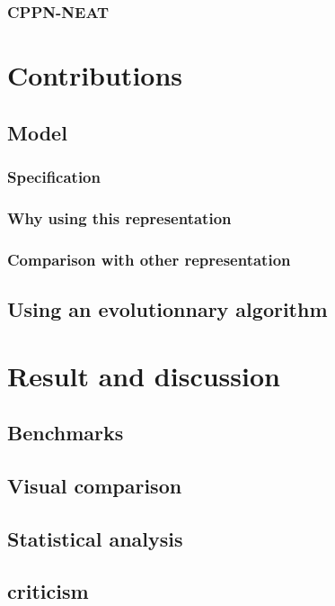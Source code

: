 \documentclass[pdftex, a4paper, 12pt]{report}
\begin{document}
            \subsection{CPPN-NEAT}
            
            \chapter{Contributions}
            \section{Model}
            \subsection{Specification}
            \subsection{Why using this representation}
            \subsection{Comparison with other representation}
            
            \section{Using an evolutionnary algorithm}

            \chapter{Result and discussion}
            \section{Benchmarks}
            \section{Visual comparison}
            \section{Statistical analysis}

            \section{criticism}
\end{document}
